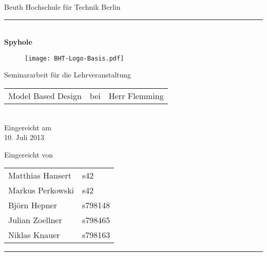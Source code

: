 

\begin{titlepage}
	\begin{center}
		\Large
		Beuth Hochschule für Technik Berlin
		\textcolor{darkBHT}{\rule{\textwidth}{0.2cm}} \\
		\vspace{2 cm}
		\Huge
		\textbf{Spyhole}
		\vspace{2 cm}
		
		\begin{figure}[htbp]
			\centering 
			\texttt{[image: BHT-Logo-Basis.pdf]}  
		\end{figure}
		
		\vspace{3cm}
		\Large
		Seminararbeit für die Lehrveranstaltung \\
		\begin{tabular}{lcl}
			Model Based Design & bei & Herr Flemming\\
		\end{tabular} 
		\\
		\vspace{0.8cm}
		Eingereicht am \\
		10. Juli 2013 %
		\vspace{0.8cm}
		
		Eingereicht von \\
		\begin{tabular}{ll}
			Matthias Hansert & s42\\
			Markus Perkowski & s42\\
			Björn Hepner & s798148\\
			Julian Zoellner & s798465\\
			Niklas Knauer & s798163\\
		\end{tabular}

	\end{center}
	\vfill
	\textcolor{darkBHT}{\rule{\textwidth}{0.2cm}}
	\vspace{1 cm}
	\normalsize
	
\end{titlepage}

%
%